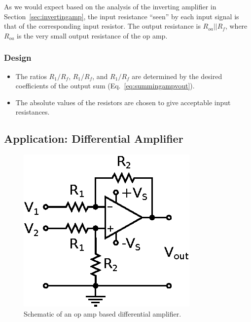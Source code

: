 \documentclass[11pt]{article}
\begin{document}
As we would expect based on the analysis of the inverting amplifier in
Section~\ref{sec:invertingamp}, the input resistance ``seen'' by each
input signal is that of the corresponding input resistor.  The output
resistance is $R_{oa}||R_f$, where $R_{oa}$ is the very small output
resistance of the op amp.

\subsubsection*{Design}
\begin{itemize}
\item The ratios $R_1/R_f$, $R_1/R_f$, and $R_1/R_f$ are determined by
  the desired coefficients of the output sum
  (Eq.~\ref{eq:summingampvout}).

\item The absolute values of the resistors are chosen to give
  acceptable input resistances.

\end{itemize}

\subsection{Application: Differential Amplifier}
\label{sec:differentialamp}

\begin{figure}[h!]
  \begin{center}
    \includegraphics{differenceamp.eps}
    \caption{Schematic of an op amp based differential amplifier.}
    \label{fig:differenceamp}
  \end{center}
\end{figure}
\end{document}
